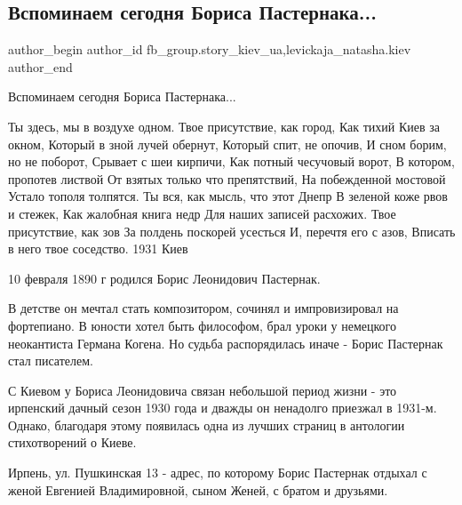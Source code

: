  
 
 
 
 
 
\subsection{Вспоминаем сегодня Бориса Пастернака...}
\label{sec:10_02_2022.fb.fb_group.story_kiev_ua.1.pasternak}
 
\ifcmt
 author_begin
   author_id fb_group.story_kiev_ua,levickaja_natasha.kiev
 author_end
\fi

Вспоминаем сегодня Бориса Пастернака...

\obeycr
Ты здесь, мы в воздухе одном.
Твое присутствие, как город,
Как тихий Киев за окном,
Который в зной лучей обернут,
Который спит, не опочив,
И сном борим, но не поборот,
Срывает с шеи кирпичи,
Как потный чесучовый ворот,
В котором, пропотев листвой
От взятых только что препятствий,
На побежденной мостовой
Устало тополя толпятся.
Ты вся, как мысль, что этот Днепр
В зеленой коже рвов и стежек,
Как жалобная книга недр
Для наших записей расхожих.
Твое присутствие, как зов
За полдень поскорей усесться
И, перечтя его с азов,
Вписать в него твое соседство.
1931 Киев
\restorecr

10 февраля 1890 г родился Борис Леонидович Пастернак.

В детстве он мечтал стать композитором, сочинял и импровизировал на фортепиано.
В юности хотел быть философом, брал уроки у немецкого неокантиста Германа
Когена. Но судьба распорядилась иначе - Борис Пастернак стал писателем.


С Киевом у Бориса Леонидовича связан небольшой период жизни - это  ирпенский
дачный сезон 1930 года и дважды он  ненадолго приезжал в 1931-м. Однако,
благодаря этому появилась одна из лучших страниц в антологии стихотворений о
Киеве.

Ирпень, ул. Пушкинская 13 - адрес, по которому Борис Пастернак  отдыхал с женой
Евгенией Владимировной, сыном Женей,  с братом и друзьями.

